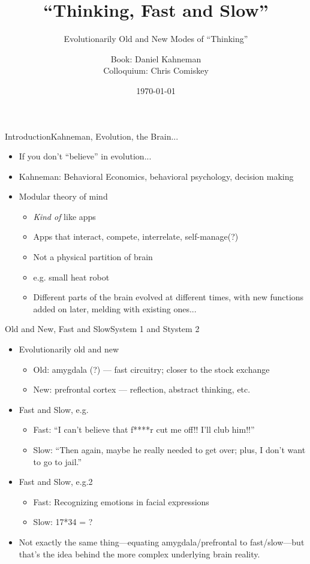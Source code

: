 \documentclass{beamer}
\institute{}
\title{``Thinking, Fast and Slow''}
\subtitle{Evolutionarily Old and New Modes of ``Thinking''}
\author{Book: Daniel Kahneman \\ Colloquium: Chris Comiskey}
\date{\today}
\begin{document}
\begin{frame}
  \titlepage
\end{frame}

\begin{frame}{Introduction}{Kahneman, Evolution, the Brain...}

  \begin{itemize}
  \addtolength{\itemsep}{0.5\baselineskip}
  \item If you don't ``believe'' in evolution...
  \item Kahneman: Behavioral Economics, behavioral psychology, decision making
  \item Modular theory of mind
    \begin{itemize}
    \addtolength{\itemsep}{0.5\baselineskip}
    \item {\it Kind of} like apps
    \item Apps that interact, compete, interrelate, self-manage(?)
    \item Not a physical partition of brain
    \item e.g. small heat robot
    \item Different parts of the brain evolved at different times, with new functions added on later, melding with existing ones...
    \end{itemize}
  \end{itemize}
\end{frame}
% 
\begin{frame}{Old and New, Fast and Slow}{System 1 and Stystem 2}
\begin{itemize}
\addtolength{\itemsep}{0.5\baselineskip}
\item Evolutionarily old and new
    \begin{itemize}
    \addtolength{\itemsep}{0.5\baselineskip}
    \item Old: amygdala (?) --- fast circuitry; closer to the stock exchange
    \item New: prefrontal cortex --- reflection, abstract thinking, etc.
    \end{itemize}
\item Fast and Slow, e.g.
    \begin{itemize}
    \addtolength{\itemsep}{0.5\baselineskip}
    \item Fast: ``I can't believe that f****r cut me off!! I'll club him!!''
    \item Slow: ``Then again, maybe he really needed to get over; plus, I don't want to go to jail.''
    \end{itemize}
\item Fast and Slow, e.g.2
    \begin{itemize}
    \addtolength{\itemsep}{0.5\baselineskip}
    \item Fast: Recognizing emotions in facial expressions
    \item Slow: 17*34 = ?
    \end{itemize}
\item Not exactly the same thing---equating amygdala/prefrontal to fast/slow---but that's the idea behind the more complex underlying brain reality.
\end{itemize}
\end{frame}
\end{document}
